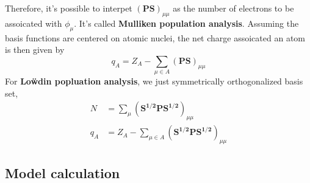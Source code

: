 \documentclass[11pt]{article}
\begin{document}
Therefore, it's possible to interpet ${(\mathbf{PS})}_{\mu \mu}$ as the number of electrons to be assoicated with $\phi_{\mu}$. It's called
\textbf{Mulliken population analysis}. Assuming the basis functions are centered on atomic nuclei, the net charge assoicated an atom is then
given by
\begin{equation}
    q_A=Z_A-\sum_{\mu \in A}{(\mathbf{PS})}_{\mu \mu}
\end{equation}
For \textbf{Lo\"wdin popluation analysis}, we just symmetrically orthogonalized basis set,
\begin{align}
    N&=\sum_{\mu}{(\mathbf{S^{1/2}PS^{1/2}})}_{\mu \mu}\\
    q_A&=Z_A-\sum_{\mu \in A}{(\mathbf{S^{1/2}PS^{1/2}})}_{\mu \mu}
\end{align}
\subsection{Model calculation}
\end{document}

